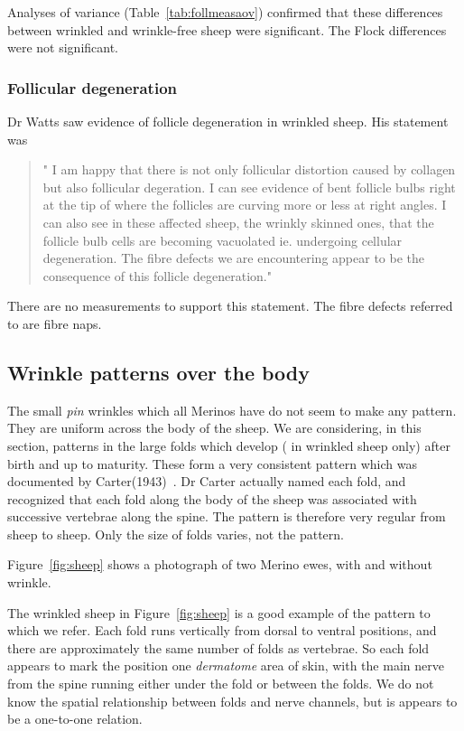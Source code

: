 \documentclass[titlepage]{article}  %
\begin{document}
Analyses of variance (Table~\ref{tab:follmeasaov}) confirmed that these differences between wrinkled and wrinkle-free sheep were significant. The Flock differences were not significant.


\subsubsection{Follicular degeneration}
Dr Watts saw evidence of follicle degeneration in wrinkled sheep. His statement was
\begin{quote}
"  I am happy that there is not only follicular distortion caused by collagen but also follicular degeration.  I can see evidence of bent follicle bulbs right at the tip of where the follicles are curving more or less at right angles.  I can also see in these affected sheep, the wrinkly skinned ones, that the follicle bulb cells are becoming vacuolated ie. undergoing cellular degeneration. The fibre defects we are encountering appear to be the consequence of this follicle degeneration."
\end{quote}

There are no measurements to support this statement. The fibre defects referred to are fibre naps. 

\subsection{Wrinkle patterns over the body}
\label{sec:pattern}
The small {\em pin} wrinkles which all Merinos have do not seem to make any pattern. They are uniform across the body of the sheep. We are considering, in this section, patterns in the large folds which develop ( in wrinkled sheep only) after birth and up to maturity. These form a very consistent pattern which was documented by Carter(1943)~\cite{cart:43}. Dr Carter actually named each fold, and recognized that each fold along the body of the sheep was associated with successive vertebrae along the spine. The pattern is therefore very regular from sheep to sheep. Only the size of folds varies, not the pattern.

Figure~\ref{fig:sheep} shows a photograph of two Merino ewes, with and without wrinkle. 

The wrinkled sheep in Figure~\ref{fig:sheep} is a good example of the pattern to which we refer.  Each fold runs vertically from dorsal to ventral positions, and there are approximately the same number of folds as vertebrae. So each fold appears to mark the position one {\em dermatome} area of skin, with the main nerve from the spine running either under the fold or between the folds. We do not know the spatial relationship between folds and nerve channels, but is appears to be a one-to-one relation.
\end{document}
